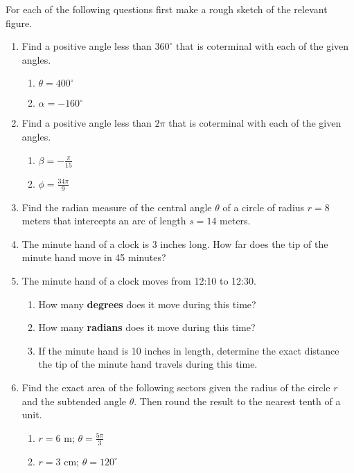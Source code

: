 For each of the following questions first make a rough sketch of the
relevant figure.
\begin{enumerate}

\item Find a positive angle less than $360^\circ$ that is coterminal with each of the given angles.
\begin{enumerate}
\item  $\theta=400^\circ$\vfill
\item $\alpha=-160^\circ$\vfill
\vfill
\end{enumerate}


\item Find a positive angle less than $2\pi$ that is coterminal with each of the given angles.
\begin{enumerate}
\item  $\displaystyle \beta=-\frac{\pi}{15}$\vfill
\item $\displaystyle \phi=\frac{34\pi}{9}$\vfill
\vfill
\end{enumerate}

\clearpage

\item Find the radian measure of the central angle $\theta$ of a circle of radius $r=8$ meters that intercepts an arc of length $s=14$ meters.
\vfill


\item The minute hand of a clock is 3 inches long.  How far does the tip of the minute hand move in 45 minutes?\vfill

  \clearpage
  
\item The minute hand of a clock moves from 12:10 to 12:30.
\begin{enumerate}
\item How many \textbf{degrees} does it move during this time?\vfill
\item How many \textbf{radians} does it move during this time?\vfill
\item If the minute hand is 10 inches in length, determine the exact distance the tip of the minute hand travels during this time.\vfill
\end{enumerate}

\item Find the exact area of the following sectors given the radius of
  the circle $r$ and the subtended angle $\theta$.  Then round the
  result to the nearest tenth of a unit.

\begin{enumerate}
\item $r=6$ m; $\theta=\frac{5\pi}{3}$\vfill
\item $r=3$ cm; $\theta=120^\circ $\vfill


\end{enumerate}
\end{enumerate}
